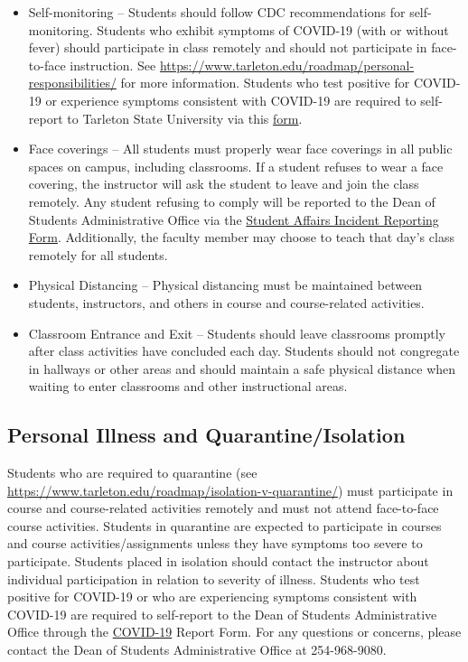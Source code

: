 \documentclass[10pt]{article}
\begin{document}
\begin{itemize}
\item Self-monitoring – Students should follow CDC recommendations for self-monitoring. Students who exhibit symptoms of COVID-19 (with or without fever) should participate in class remotely and should not participate in face-to-face instruction. See \url{https://www.tarleton.edu/roadmap/personal-responsibilities/} for more information. Students who test positive for COVID-19 or experience symptoms consistent with COVID-19 are required to self-report to Tarleton State University via this \href{https://cm.maxient.com/reportingform.php?TarletonStateUniv\&layout\_id=6.}{form}.

\item Face coverings – All students must properly wear face coverings in all public spaces on campus, including classrooms.  If a student refuses to wear a face covering, the instructor will ask the student to leave and join the class remotely. Any student refusing to comply will be reported  to the Dean of Students Administrative Office via the \href{https://cm.maxient.com/reportingform.php?TarletonStateUniv\&layout\_id=0}{Student Affairs Incident Reporting Form}. Additionally, the faculty member may choose to teach that day’s class remotely for all students.

\item Physical Distancing – Physical distancing must be maintained between students, instructors, and others in course and course-related activities.

\item Classroom Entrance and Exit – Students should leave classrooms promptly after class activities have concluded each day. Students should not congregate in hallways or other areas and should maintain a safe physical distance when waiting to enter classrooms and other instructional areas.
\end{itemize}

\subsection*{Personal Illness and Quarantine/Isolation}
\label{sec:orge0095c2}
Students who are required to quarantine (see \url{https://www.tarleton.edu/roadmap/isolation-v-quarantine/}) must participate in course and course-related activities remotely and must not attend face-to-face course activities. Students in quarantine are expected to participate in courses and course activities/assignments unless they have symptoms too severe to participate. Students placed in isolation should contact the instructor about individual participation in relation to severity of illness. Students who test positive for COVID-19 or who are experiencing symptoms consistent with COVID-19 are required to self-report to the Dean of Students Administrative Office through the \href{https://cm.maxient.com/reportingform.php?TarletonStateUniv\&layout\_id=6}{COVID-19} Report Form.  For any questions or concerns, please contact the Dean of Students Administrative Office at 254-968-9080. 
\end{document}
